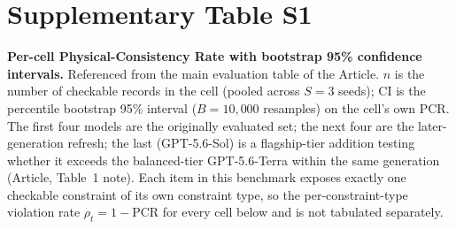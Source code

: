 \documentclass[11pt]{article}
\begin{document}
\clearpage
\section*{Supplementary Table S1}
\noindent\textbf{Per-cell Physical-Consistency Rate with bootstrap 95\% confidence
intervals.} Referenced from the main evaluation table of the Article. $n$ is the number of checkable records in the cell
(pooled across $S=3$ seeds); CI is the percentile bootstrap 95\% interval ($B=10{,}000$
resamples) on the cell's own PCR. The first four models are the originally evaluated set;
the next four are the later-generation refresh; the last (GPT-5.6-Sol) is a flagship-tier
addition testing whether it exceeds the balanced-tier GPT-5.6-Terra within the same
generation (Article, Table~1 note). Each item in this benchmark exposes
exactly one checkable constraint of its own constraint type, so the per-constraint-type
violation rate $\rho_t=1-\mathrm{PCR}$ for every cell below and is not tabulated separately.
\end{document}
